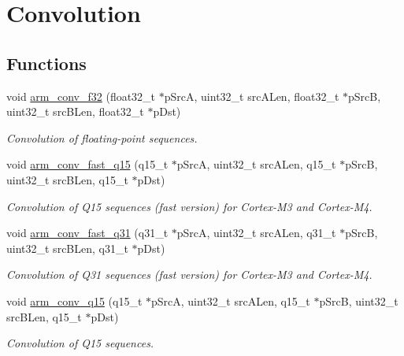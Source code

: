 \hypertarget{group___conv}{\section{Convolution}
\label{group___conv}
}
\subsection*{Functions}
\begin{DoxyCompactItemize}
\item 
void \hyperlink{group___conv_ga3f860dc98c6fc4cafc421e4a2aed3c89}{arm\-\_\-conv\-\_\-f32} (float32\-\_\-t $\ast$p\-Src\-A, uint32\-\_\-t src\-A\-Len, float32\-\_\-t $\ast$p\-Src\-B, uint32\-\_\-t src\-B\-Len, float32\-\_\-t $\ast$p\-Dst)
\begin{DoxyCompactList}\small\item\em Convolution of floating-\/point sequences. \end{DoxyCompactList}\item 
void \hyperlink{group___conv_gad75ca978ce906e04abdf86a8d76306d4}{arm\-\_\-conv\-\_\-fast\-\_\-q15} (q15\-\_\-t $\ast$p\-Src\-A, uint32\-\_\-t src\-A\-Len, q15\-\_\-t $\ast$p\-Src\-B, uint32\-\_\-t src\-B\-Len, q15\-\_\-t $\ast$p\-Dst)
\begin{DoxyCompactList}\small\item\em Convolution of Q15 sequences (fast version) for Cortex-\/\-M3 and Cortex-\/\-M4. \end{DoxyCompactList}\item 
void \hyperlink{group___conv_ga51112dcdf9b3624eb05182cdc4da9ec0}{arm\-\_\-conv\-\_\-fast\-\_\-q31} (q31\-\_\-t $\ast$p\-Src\-A, uint32\-\_\-t src\-A\-Len, q31\-\_\-t $\ast$p\-Src\-B, uint32\-\_\-t src\-B\-Len, q31\-\_\-t $\ast$p\-Dst)
\begin{DoxyCompactList}\small\item\em Convolution of Q31 sequences (fast version) for Cortex-\/\-M3 and Cortex-\/\-M4. \end{DoxyCompactList}\item 
void \hyperlink{group___conv_gaccd6a89b0ff7a94df64610598e6e6893}{arm\-\_\-conv\-\_\-q15} (q15\-\_\-t $\ast$p\-Src\-A, uint32\-\_\-t src\-A\-Len, q15\-\_\-t $\ast$p\-Src\-B, uint32\-\_\-t src\-B\-Len, q15\-\_\-t $\ast$p\-Dst)
\begin{DoxyCompactList}\small\item\em Convolution of Q15 sequences. \end{DoxyCompactList}\item 

\end{DoxyCompactItemize}
